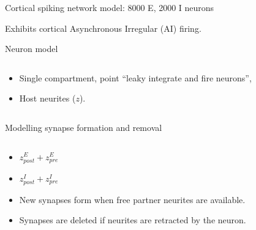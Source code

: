 \begin{frame}[c]{Cortical spiking network model: 8000 E, 2000 I neurons}
  \begin{figure}[h]
    \def\svgwidth{0.7\textwidth}
    \vspace{-0.5cm}
  \end{figure}
  \begin{center}
    Exhibits cortical \alert{Asynchronous Irregular (AI)} firing.
  \end{center}
\end{frame}
\begin{frame}[t]{Neuron model}
  \begin{columns}
    \begin{column}{0.6\textwidth}
      \begin{itemize}
        \item Single compartment, point \enquote{leaky integrate and fire neurons}\footnotemark[1]{},
        \item Host neurites (\(z\)).
      \end{itemize}
    \end{column}
    \begin{column}{0.4\textwidth}
      
    \end{column}
  \end{columns}
\end{frame}
\begin{frame}[t]{Modelling synapse formation and removal}
  \begin{columns}
    \begin{column}{0.6\textwidth}
      \begin{itemize}
        \item \(z^E_{post} + z^E_{pre}\)
        \item \(z^I_{post} + z^I_{pre}\)
        \item New synapses form when \alert{free} partner neurites are available.
        \item Synapses are deleted if neurites are \alert{retracted} by the neuron.
      \end{itemize}
    \end{column}
    \begin{column}{0.4\textwidth}
      
    \end{column}
  \end{columns}
\end{frame}
